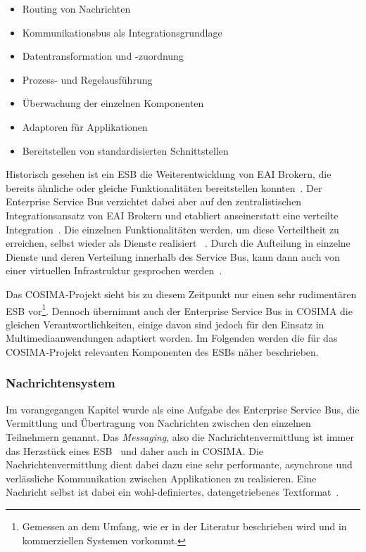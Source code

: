   \begin{itemize}
    \item Routing von Nachrichten
    \item Kommunikationsbus als Integrationsgrundlage
    \item Datentransformation und -zuordnung
    \item Prozess- und Regelausführung
    \item Überwachung der einzelnen Komponenten
    \item Adaptoren für Applikationen
    \item Bereitstellen von standardisierten Schnittstellen
  \end{itemize}

  Historisch gesehen ist ein ESB die Weiterentwicklung von EAI Brokern, die bereits ähnliche oder gleiche Funktionalitäten bereitstellen konnten~\citep[S. 146]{masak2007ssb}. Der Enterprise Service Bus verzichtet dabei aber auf den zentralistischen Integrationsansatz von EAI Brokern und etabliert anseinerstatt eine verteilte Integration~\citep[S. 4]{enterprise_service_bus}. Die einzelnen Funktionalitäten werden, um diese Verteiltheit zu erreichen, selbst wieder als Dienste realisiert ~\citep{enterprise_service_bus,masak2007ssb,papazoglou2007soc}. Durch die Aufteilung in einzelne Dienste und deren Verteilung innerhalb des Service Bus, kann dann auch von einer virtuellen Infrastruktur gesprochen werden~\citep[S. 136]{soa_goes_real}.
  
  Das COSIMA-Projekt sieht bis zu diesem Zeitpunkt nur einen sehr rudimentären ESB vor\footnote{Gemessen an dem Umfang, wie er in der Literatur beschrieben wird und in kommerziellen Systemen vorkommt.}. Dennoch übernimmt auch der Enterprise Service Bus in COSIMA die gleichen Verantwortlichkeiten, einige davon sind jedoch für den Einsatz in Multimediaanwendungen adaptiert worden. Im Folgenden werden die für das COSIMA-Projekt relevanten Komponenten des ESBs näher beschrieben.
  
\subsubsection{Nachrichtensystem} %
\label{ssub:nachrichtensystem}
  
  Im vorangegangen Kapitel wurde als eine Aufgabe des Enterprise Service Bus, die Vermittlung und Übertragung von Nachrichten zwischen den einzelnen Teilnehmern genannt. Das \emph{Messaging}, also die Nachrichtenvermittlung ist immer das Herzstück eines ESB~\citep[S. 77]{enterprise_service_bus} und daher auch in COSIMA. Die Nachrichtenvermittlung dient dabei dazu eine sehr performante, asynchrone und verlässliche Kommunikation zwischen Applikationen zu realisieren. Eine Nachricht selbst ist dabei ein wohl-definiertes, datengetriebenes Textformat~\citep[S. 60f]{web_services_principles_and_technology}.
  
